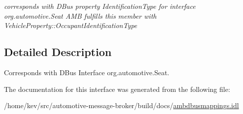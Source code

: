 \begin{DoxyCompactItemize}
\begin{DoxyCompactList}\small\item\em corresponds with D\+Bus property Identification\+Type for interface org.\+automotive.\+Seat A\+M\+B fulfills this member with Vehicle\+Property\+::\+Occupant\+Identification\+Type \end{DoxyCompactList}\end{DoxyCompactItemize}


\subsection{Detailed Description}
Corresponds with D\+Bus Interface org.\+automotive.\+Seat. 

The documentation for this interface was generated from the following file\+:\begin{DoxyCompactItemize}
\item 
/home/kev/src/automotive-\/message-\/broker/build/docs/\hyperlink{ambdbusmappings_8idl}{ambdbusmappings.\+idl}\end{DoxyCompactItemize}
